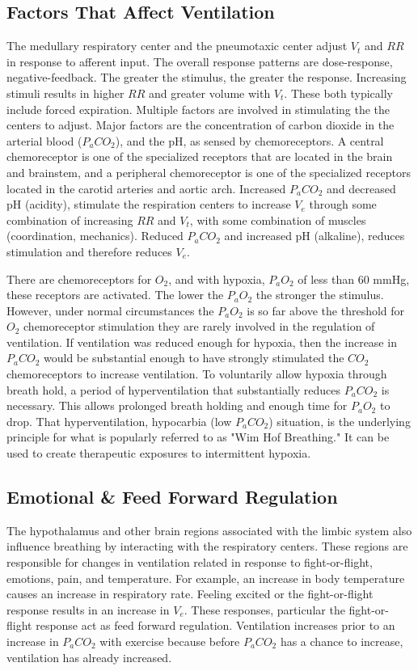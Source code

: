 \subsection{Factors That Affect Ventilation} 

The medullary respiratory center and the pneumotaxic center adjust $V_t$ and $RR$ in response to afferent input.  The overall response patterns are dose-response, negative-feedback. The greater the stimulus, the greater the response. Increasing stimuli results in higher $RR$ and greater volume with $V_t$. These both typically include forced expiration.  Multiple factors are involved in stimulating the the centers to adjust. Major factors are the concentration of carbon dioxide in the arterial blood ($P_aCO_2$), and the pH, as sensed by chemoreceptors. A central chemoreceptor is one of the specialized receptors that are located in the brain and brainstem, and a peripheral chemoreceptor is one of the specialized receptors located in the carotid arteries and aortic arch. Increased $P_aCO_2$ and decreased pH (acidity), stimulate the respiration centers to increase $V_e$ through some combination of increasing $RR$ and $V_t$, with some combination of muscles (coordination, mechanics). Reduced $P_aCO_2$ and increased pH (alkaline), reduces stimulation and therefore reduces $V_e$.

There are chemoreceptors for $O_2$, and with hypoxia, $P_aO_2$ of less than 60 mmHg, these receptors are activated. The lower the $P_aO_2$ the stronger the stimulus. However, under normal circumstances the $P_aO_2$ is so far above the threshold for $O_2$ chemoreceptor stimulation they are rarely involved in the regulation of ventilation. If ventilation was reduced enough for hypoxia, then the increase in $P_aCO_2$ would be substantial enough to have strongly stimulated the $CO_2$ chemoreceptors to increase ventilation. To voluntarily allow hypoxia through breath hold, a period of hyperventilation that substantially reduces $P_aCO_2$ is necessary. This allows prolonged breath holding and enough time for $P_aO_2$ to drop. That hyperventilation, hypocarbia (low $P_aCO_2$) situation, is the underlying principle for what is popularly referred to as "Wim Hof Breathing." It can be used to create therapeutic exposures to intermittent hypoxia.

\subsection{Emotional \& Feed Forward Regulation}
The hypothalamus and other brain regions associated with the limbic system also influence breathing by interacting with the respiratory centers. These regions are responsible for changes in ventilation related in response to fight-or-flight, emotions, pain, and temperature. For example, an increase in body temperature causes an increase in respiratory rate. Feeling excited or the fight-or-flight response results in an increase in $V_e$. These responses, particular the fight-or-flight response act as feed forward regulation. Ventilation increases prior to an increase in $P_aCO_2$ with exercise because before $P_aCO_2$ has a chance to increase, ventilation has already increased.

